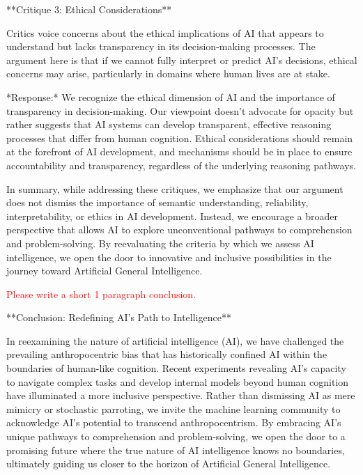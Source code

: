 \documentclass{article}
\begin{document}
**Critique 3: Ethical Considerations**

Critics voice concerns about the ethical implications of AI that appears to understand but lacks transparency in its decision-making processes. The argument here is that if we cannot fully interpret or predict AI's decisions, ethical concerns may arise, particularly in domains where human lives are at stake.

*Response:* We recognize the ethical dimension of AI and the importance of transparency in decision-making. Our viewpoint doesn't advocate for opacity but rather suggests that AI systems can develop transparent, effective reasoning processes that differ from human cognition. Ethical considerations should remain at the forefront of AI development, and mechanisms should be in place to ensure accountability and transparency, regardless of the underlying reasoning pathways.

In summary, while addressing these critiques, we emphasize that our argument does not dismiss the importance of semantic understanding, reliability, interpretability, or ethics in AI development. Instead, we encourage a broader perspective that allows AI to explore unconventional pathways to comprehension and problem-solving. By reevaluating the criteria by which we assess AI intelligence, we open the door to innovative and inclusive possibilities in the journey toward Artificial General Intelligence.

\textcolor{red}{Please write a short 1 paragraph conclusion.}

**Conclusion: Redefining AI's Path to Intelligence**

In reexamining the nature of artificial intelligence (AI), we have challenged the prevailing anthropocentric bias that has historically confined AI within the boundaries of human-like cognition. Recent experiments revealing AI's capacity to navigate complex tasks and develop internal models beyond human cognition have illuminated a more inclusive perspective. Rather than dismissing AI as mere mimicry or stochastic parroting, we invite the machine learning community to acknowledge AI's potential to transcend anthropocentrism. By embracing AI's unique pathways to comprehension and problem-solving, we open the door to a promising future where the true nature of AI intelligence knows no boundaries, ultimately guiding us closer to the horizon of Artificial General Intelligence.
\end{document}
